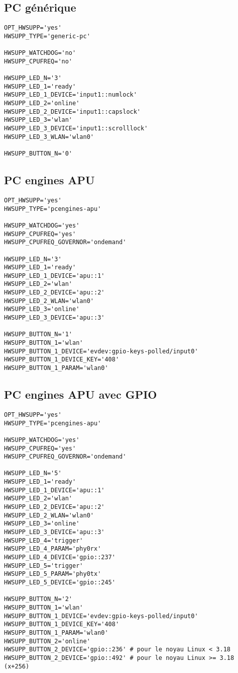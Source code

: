 \subsection{PC générique}

\begin{verbatim}
OPT_HWSUPP='yes'
HWSUPP_TYPE='generic-pc'

HWSUPP_WATCHDOG='no'
HWSUPP_CPUFREQ='no'

HWSUPP_LED_N='3'
HWSUPP_LED_1='ready'
HWSUPP_LED_1_DEVICE='input1::numlock'
HWSUPP_LED_2='online'
HWSUPP_LED_2_DEVICE='input1::capslock'
HWSUPP_LED_3='wlan'
HWSUPP_LED_3_DEVICE='input1::scrolllock'
HWSUPP_LED_3_WLAN='wlan0'

HWSUPP_BUTTON_N='0'
\end{verbatim}

\subsection{PC engines APU}

\begin{verbatim}
OPT_HWSUPP='yes'
HWSUPP_TYPE='pcengines-apu'

HWSUPP_WATCHDOG='yes'
HWSUPP_CPUFREQ='yes'
HWSUPP_CPUFREQ_GOVERNOR='ondemand'

HWSUPP_LED_N='3'
HWSUPP_LED_1='ready'
HWSUPP_LED_1_DEVICE='apu::1'
HWSUPP_LED_2='wlan'
HWSUPP_LED_2_DEVICE='apu::2'
HWSUPP_LED_2_WLAN='wlan0'
HWSUPP_LED_3='online'
HWSUPP_LED_3_DEVICE='apu::3'

HWSUPP_BUTTON_N='1'
HWSUPP_BUTTON_1='wlan'
HWSUPP_BUTTON_1_DEVICE='evdev:gpio-keys-polled/input0'
HWSUPP_BUTTON_1_DEVICE_KEY='408'
HWSUPP_BUTTON_1_PARAM='wlan0'
\end{verbatim}

\subsection{PC engines APU avec GPIO}

\begin{verbatim}
OPT_HWSUPP='yes'
HWSUPP_TYPE='pcengines-apu'

HWSUPP_WATCHDOG='yes'
HWSUPP_CPUFREQ='yes'
HWSUPP_CPUFREQ_GOVERNOR='ondemand'

HWSUPP_LED_N='5'
HWSUPP_LED_1='ready'
HWSUPP_LED_1_DEVICE='apu::1'
HWSUPP_LED_2='wlan'
HWSUPP_LED_2_DEVICE='apu::2'
HWSUPP_LED_2_WLAN='wlan0'
HWSUPP_LED_3='online'
HWSUPP_LED_3_DEVICE='apu::3'
HWSUPP_LED_4='trigger'
HWSUPP_LED_4_PARAM='phy0rx'
HWSUPP_LED_4_DEVICE='gpio::237'
HWSUPP_LED_5='trigger'
HWSUPP_LED_5_PARAM='phy0tx'
HWSUPP_LED_5_DEVICE='gpio::245'

HWSUPP_BUTTON_N='2'
HWSUPP_BUTTON_1='wlan'
HWSUPP_BUTTON_1_DEVICE='evdev:gpio-keys-polled/input0'
HWSUPP_BUTTON_1_DEVICE_KEY='408'
HWSUPP_BUTTON_1_PARAM='wlan0'
HWSUPP_BUTTON_2='online'
HWSUPP_BUTTON_2_DEVICE='gpio::236' # pour le noyau Linux < 3.18
HWSUPP_BUTTON_2_DEVICE='gpio::492' # pour le noyau Linux >= 3.18 (x+256)
\end{verbatim}

